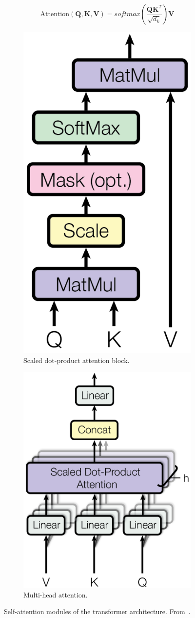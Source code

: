 \begin{equation}
    \text{Attention}(\bm{Q}, \bm{K}, \bm{V})  = softmax \left( \frac{\bm{Q}\bm{K}^T}{\sqrt{d_k}} \right) \bm{V}
    \label{eq:attention}
\end{equation}

\begin{figure}[t]
\centering
\begin{subfigure}{.42\textwidth}
  \centering
  \includegraphics[width=.4\linewidth]{Figures/Background/scaled_dot_product_att.png}
  \caption{Scaled dot-product attention block.}
  \label{fig:sub1}
\end{subfigure}%
\begin{subfigure}{.5\textwidth}
  \centering
  \includegraphics[width=.6\linewidth]{Figures/Background/multi_head_att.png}
  \caption{Multi-head attention.}
  \label{fig:sub2}
\end{subfigure}
\caption{Self-attention modules of the transformer architecture. From~\cite{vaswani2017attention}.}
\label{fig:attention_transformer}
\end{figure}


